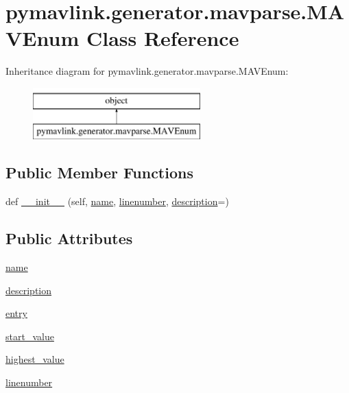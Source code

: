 \hypertarget{classpymavlink_1_1generator_1_1mavparse_1_1MAVEnum}{}\section{pymavlink.\+generator.\+mavparse.\+M\+A\+V\+Enum Class Reference}
\label{classpymavlink_1_1generator_1_1mavparse_1_1MAVEnum}
Inheritance diagram for pymavlink.\+generator.\+mavparse.\+M\+A\+V\+Enum\+:\begin{figure}[H]
\begin{center}
\leavevmode
\includegraphics[height=2.000000cm]{classpymavlink_1_1generator_1_1mavparse_1_1MAVEnum}
\end{center}
\end{figure}
\subsection*{Public Member Functions}
\begin{DoxyCompactItemize}
\item 
def \mbox{\hyperlink{classpymavlink_1_1generator_1_1mavparse_1_1MAVEnum_a2f523a538af870a22eade7a19ec76ccc}{\+\_\+\+\_\+init\+\_\+\+\_\+}} (self, \mbox{\hyperlink{classpymavlink_1_1generator_1_1mavparse_1_1MAVEnum_a2fddee7aa1c4e8898fb960602625d3b6}{name}}, \mbox{\hyperlink{classpymavlink_1_1generator_1_1mavparse_1_1MAVEnum_a3a053a5e96cf7e8dd8c33fcb776983e7}{linenumber}}, \mbox{\hyperlink{classpymavlink_1_1generator_1_1mavparse_1_1MAVEnum_a66ed34a84607dffbd68dca1f02eb78ae}{description}}=\textquotesingle{}\textquotesingle{})
\end{DoxyCompactItemize}
\subsection*{Public Attributes}
\begin{DoxyCompactItemize}
\item 
\mbox{\hyperlink{classpymavlink_1_1generator_1_1mavparse_1_1MAVEnum_a2fddee7aa1c4e8898fb960602625d3b6}{name}}
\item 
\mbox{\hyperlink{classpymavlink_1_1generator_1_1mavparse_1_1MAVEnum_a66ed34a84607dffbd68dca1f02eb78ae}{description}}
\item 
\mbox{\hyperlink{classpymavlink_1_1generator_1_1mavparse_1_1MAVEnum_ad78eb30810557b736163590cc2f26499}{entry}}
\item 
\mbox{\hyperlink{classpymavlink_1_1generator_1_1mavparse_1_1MAVEnum_aa1f35a0fc1111618288150eca229a106}{start\+\_\+value}}
\item 
\mbox{\hyperlink{classpymavlink_1_1generator_1_1mavparse_1_1MAVEnum_a27010a521739ffcfc913d77c21c966f8}{highest\+\_\+value}}
\item 
\mbox{\hyperlink{classpymavlink_1_1generator_1_1mavparse_1_1MAVEnum_a3a053a5e96cf7e8dd8c33fcb776983e7}{linenumber}}
\end{DoxyCompactItemize}


